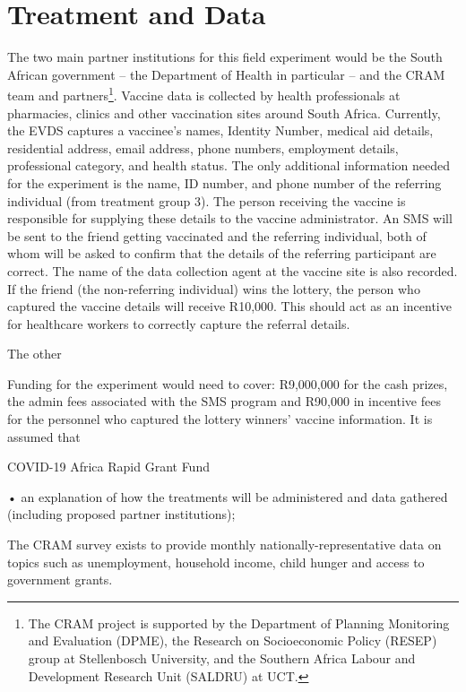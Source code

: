 \documentclass[11pt,preprint, authoryear]{elsarticle}
\numberwithin{equation}{section}
\numberwithin{figure}{section}
\numberwithin{table}{section}
\let\rmarkdownfootnote\footnote%
\def\footnote{\protect\rmarkdownfootnote}
\begin{document}
\hypertarget{treatment-and-data}{%
\section{\texorpdfstring{Treatment and Data
\label{treatment}}{Treatment and Data }}\label{treatment-and-data}}

The two main partner institutions for this field experiment would be the
South African government -- the Department of Health in particular --
and the CRAM team and partners\footnote{The CRAM project is supported by
  the Department of Planning Monitoring and Evaluation (DPME), the
  Research on Socioeconomic Policy (RESEP) group at Stellenbosch
  University, and the Southern Africa Labour and Development Research
  Unit (SALDRU) at UCT.}. Vaccine data is collected by health
professionals at pharmacies, clinics and other vaccination sites around
South Africa. Currently, the EVDS captures a vaccinee's names, Identity
Number, medical aid details, residential address, email address, phone
numbers, employment details, professional category, and health status.
The only additional information needed for the experiment is the name,
ID number, and phone number of the referring individual (from treatment
group 3). The person receiving the vaccine is responsible for supplying
these details to the vaccine administrator. An SMS will be sent to the
friend getting vaccinated and the referring individual, both of whom
will be asked to confirm that the details of the referring participant
are correct. The name of the data collection agent at the vaccine site
is also recorded. If the friend (the non-referring individual) wins the
lottery, the person who captured the vaccine details will receive
R10,000. This should act as an incentive for healthcare workers to
correctly capture the referral details.

The other

Funding for the experiment would need to cover: R9,000,000 for the cash
prizes, the admin fees associated with the SMS program and R90,000 in
incentive fees for the personnel who captured the lottery winners'
vaccine information. It is assumed that

COVID-19 Africa Rapid Grant Fund

• an explanation of how the treatments will be administered and data
gathered (including proposed partner institutions);

The CRAM survey exists to provide monthly nationally-representative data
on topics such as unemployment, household income, child hunger and
access to government grants.
\end{document}
